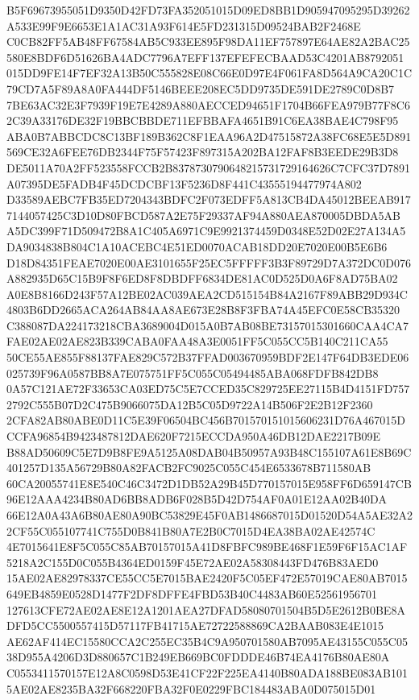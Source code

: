 \documentclass[UTF8,fontset=fandol,zihao=-4,a4paper]{ctexart}
\begin{document}
{{B5F69673955051D9350D42FD73FA352051015D09ED8BB1D905947095295D39262A533E99F9E6653E1A1AC31A93F614E5FD231315D09524BAB2F2468E
C0CB82FF5AB48FF67584AB5C933EE895F98DA11EF757897E64AE82A2BAC25580E8BDF6D51626BA4ADC7796A7EFF137EFEFECBAAD53C4201AB8792051
015DD9FE14F7EF32A13B50C555828E08C66E0D97E4F061FA8D564A9CA20C1C79CD7A5F89A8A0FA444DF5146BEEE208EC5DD9735DE591DE2789C0D8B7
7BE63AC32E3F7939F19E7E4289A880AECCED94651F1704B66FEA979B77F8C62C39A33176DE32F19BBCBBDE711EFBBAFA4651B91C6EA38BAE4C798F95
ABA0B7ABBCDC8C13BF189B362C8F1EAA96A2D47515872A38FC68E5E5D891569CE32A6FEE76DB2344F75F57423F897315A202BA12FAF8B3EEDE29B3D8
DE5011A70A2FF523558FCCB2B8378730790648215731729164626C7CFC37D7891A07395DE5FADB4F45DCDCBF13F5236D8F441C43555194477974A802
D33589AEBC7FB35ED7204343BDFC2F073EDFF5A813CB4DA45012BEEAB9177144057425C3D10D80FBCD587A2E75F29337AF94A880AEA870005DBDA5AB
A5DC399F71D509472B8A1C405A6971C9E9921374459D0348E52D02E27A134A5DA9034838B804C1A10ACEBC4E51ED0070ACAB18DD20E7020E00B5E6B6
D18D84351FEAE7020E00AE3101655F25EC5FFFFF3B3F89729D7A372DC0D076A882935D65C15B9F8F6ED8F8DBDFF6834DE81AC0D525D0A6F8AD75BA02
A0E8B8166D243F57A12BE02AC039AEA2CD515154B84A2167F89ABB29D934C4803B6DD2665ACA264AB84AA8AE673E28B8F3FBA74A45EFC0E58CB35320
C388087DA224173218CBA3689004D015A0B7AB08BE73157015301660CAA4CA7FAE02AE02AE823B339CABA0FAA48A3E0051FF5C055CC5B140C211CA55
50CE55AE855F88137FAE829C572B37FFAD003670959BDF2E147F64DB3EDE06025739F96A0587BB8A7E075751FF5C055C05494485ABA068FDFB842DB8
0A57C121AE72F33653CA03ED75C5E7CCED35C829725EE27115B4D4151FD7572792C555B07D2C475B9066075DA12B5C05D9722A14B506F2E2B12F2360
2CFA82AB80ABE0D11C5E39F06504BC456B701570151015606231D76A467015DCCFA96854B9423487812DAE620F7215ECCDA950A46DB12DAE2217B09E
B88AD50609C5E7D9B8FE9A5125A08DAB04B50957A93B48C155107A61E8B69C401257D135A56729B80A82FACB2FC9025C055C454E6533678B711580AB
60CA20055741E8E540C46C3472D1DB52A29B45D770157015E958FF6D659147CB96E12AAA4234B80AD6BB8ADB6F028B5D42D754AF0A01E12AA02B40DA
66E12A0A43A6B80AE80A90BC53829E45F0AB1486687015D01520D54A5AE32A22CF55C055107741C755D0B841B80A7E2B0C7015D4EA38BA02AE42574C
4E7015641E8F5C055C85AB70157015A41D8FBFC989BE468F1E59F6F15AC1AF5218A2C155D0C055B4364ED0159F45E72AE02A58308443FD476B83AED0
15AE02AE82978337CE55CC5E7015BAE2420F5C05EF472E57019CAE80AB7015649EB4859E0528D1477F2DF8DFFE4FBD53B40C4483AB60E52561956701
127613CFE72AE02AE8E12A1201AEA27DFAD58080701504B5D5E2612B0BE8ADFD5CC5500557415D57117FB41715AE72722588869CA2BAAB083E4E1015
AE62AF414EC15580CCA2C255EC35B4C9A950701580AB7095AE43155C055C0538D955A4206D3D880657C1B249EB669BC0FDDDE46B74EA4176B80AE80A
C0553411570157E12A8C0598D53E41CF22F225EA4140B80ADA188BE083AB1015AE02AE8235BA32F668220FBA32F0E0229FBC184483ABA0D075015D01
}}
\end{document}
